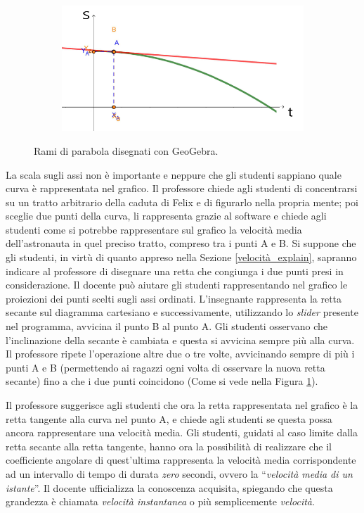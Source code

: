\documentclass{report} \usepackage[T1]{fontenc} \usepackage[italian]{babel}
\begin{document}
\begin{figure}[H]
\begin{subfigure}[b]{0.49\textwidth}
  \end{subfigure}
  \begin{subfigure}[b]{0.49\textwidth}
  \includegraphics[width=\textwidth]{tg4}
  \end{subfigure}
  \caption{
           Rami di parabola  disegnati con GeoGebra.
          }
  \label{fig:geogebra}
\end{figure}
La scala sugli assi non è importante e neppure che gli studenti sappiano quale
curva è rappresentata nel grafico.
Il professore chiede agli studenti di concentrarsi su un tratto arbitrario della
caduta di Felix e di figurarlo nella propria mente; poi sceglie due punti
della curva, li rappresenta grazie al software e chiede agli studenti
come si potrebbe rappresentare sul grafico la velocità media dell'astronauta
in quel preciso tratto, compreso tra i punti A e B.
Si suppone che gli studenti, in virtù di quanto appreso
nella Sezione \ref{velocità_explain}, sapranno indicare al professore di
disegnare una retta che congiunga i due punti presi in considerazione.
Il docente può aiutare gli studenti rappresentando nel grafico le proiezioni
dei punti scelti sugli assi ordinati.
L'insegnante rappresenta la retta secante sul diagramma cartesiano e
successivamente, utilizzando lo \emph{slider} presente nel programma,
avvicina il punto B al punto A. Gli studenti osservano che l'inclinazione
della secante è cambiata e questa si avvicina sempre più alla curva.
Il professore ripete l'operazione altre due o
tre volte, avvicinando sempre di più i punti A e B (permettendo ai ragazzi
ogni volta di osservare la nuova retta secante) fino a che i due punti
coincidono (Come si vede nella Figura \ref{fig:geogebra}).

Il professore suggerisce agli studenti che ora la retta rappresentata nel grafico
è la retta tangente alla curva nel punto A, e chiede agli studenti se questa possa
ancora rappresentare una velocità media. Gli studenti, guidati al caso limite dalla retta
secante alla retta tangente, hanno ora la possibilità di realizzare che il coefficiente
angolare di quest'ultima rappresenta la velocità media corrispondente ad un intervallo
di tempo di durata \emph{zero} secondi, ovvero la ``\emph{velocità media di un istante}''.
Il docente ufficializza la conoscenza acquisita, spiegando che questa grandezza è
chiamata \emph{velocità instantanea} o più semplicemente \emph{velocità}.
\end{document}
